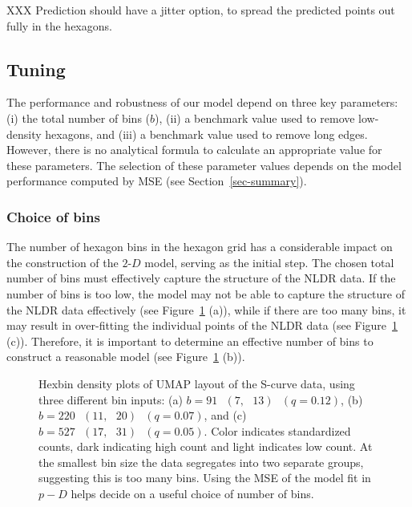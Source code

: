 \documentclass[
  12pt]{article}
\newcommand\gD{$2\text{-}D$}
\begin{document}
XXX Prediction should have a jitter option, to spread the predicted
points out fully in the hexagons.

\subsection{Tuning}\label{tuning}

The performance and robustness of our model depend on three key
parameters: (i) the total number of bins (\(b\)), (ii) a benchmark value
used to remove low-density hexagons, and (iii) a benchmark value used to
remove long edges. However, there is no analytical formula to calculate
an appropriate value for these parameters. The selection of these
parameter values depends on the model performance computed by MSE (see
Section~\ref{sec-summary}).

\subsubsection{Choice of bins}\label{choice-of-bins}

The number of hexagon bins in the hexagon grid has a considerable impact
on the construction of the \gD{} model, serving as the initial step. The
chosen total number of bins must effectively capture the structure of
the NLDR data. If the number of bins is too low, the model may not be
able to capture the structure of the NLDR data effectively (see
Figure~\ref{fig-bins-scurve} (a)), while if there are too many bins, it
may result in over-fitting the individual points of the NLDR data (see
Figure~\ref{fig-bins-scurve} (c)). Therefore, it is important to
determine an effective number of bins to construct a reasonable model
(see Figure~\ref{fig-bins-scurve} (b)).

\begin{figure}[H]


\caption{\label{fig-bins-scurve}Hexbin density plots of UMAP layout of
the S-curve data, using three different bin inputs: (a)
\(b = 91 \text{ } (7, \text{ }13)  \text{ }(q = 0.12)\), (b)
\(b = 220 \text{ } (11, \text{ }20) \text{ }(q = 0.07)\), and (c)
\(b = 527 \text{ } (17, \text{ }31) \text{ }(q = 0.05)\). Color
indicates standardized counts, dark indicating high count and light
indicates low count. At the smallest bin size the data segregates into
two separate groups, suggesting this is too many bins. Using the MSE of
the model fit in \(p-D\) helps decide on a useful choice of number of
bins.}

\end{figure}%
\end{document}
